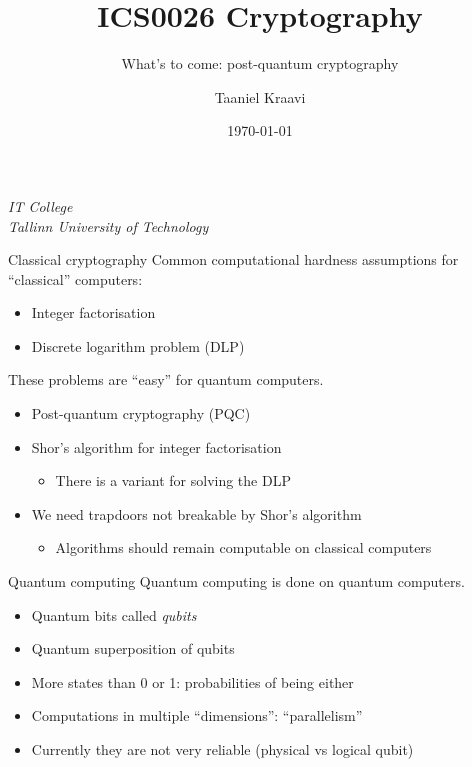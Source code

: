 \usetikzlibrary{positioning,calc,external,arrows.meta}

\title{ICS0026 Cryptography}
\subtitle{What's to come: post-quantum cryptography}
\date{\today}
\author{Taaniel Kraavi}
\institute%
{%
  \textit{IT College}\\
  \textit{Tallinn University of Technology}
}


\begin{frame}
  \titlepage
\end{frame}

\begin{frame}{Classical cryptography}
  Common computational hardness assumptions for \enquote{classical} computers:
  \begin{itemize}[<+(1)->]
    \item Integer factorisation
    \item Discrete logarithm problem (DLP)
  \end{itemize}

  \vspace*{1em}

  \pause
  These problems are \enquote{easy} for quantum computers.
  \begin{itemize}[<+(1)->]
    \item Post-quantum cryptography (PQC)
    \item Shor's algorithm for integer factorisation
    \begin{itemize}
      \item There is a variant for solving the DLP
    \end{itemize}
    \item We need trapdoors not breakable by Shor's algorithm
    \begin{itemize}
      \item Algorithms should remain computable on classical computers
    \end{itemize}
  \end{itemize}
\end{frame}

\begin{frame}{Quantum computing}
  Quantum computing is done on quantum computers.
  \begin{itemize}[<+(1)->]
    \item Quantum bits called \emph{qubits}
    \item Quantum superposition of qubits
    \item More states than 0 or 1: probabilities of being either
    \item Computations in multiple \enquote{dimensions}: \enquote{parallelism}
    \item Currently they are not very reliable (physical vs logical qubit)
  \end{itemize}
\end{frame}

